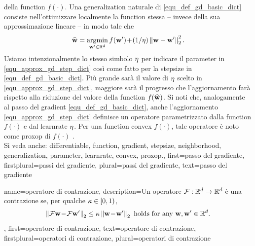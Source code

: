 {{		della \gls{function} $f(\cdot)$. Una \gls{generalization} naturale di \eqref{equ_def_gd_basic_dict} consiste nell’ottimizzare localmente 
		la \gls{function} stessa – invece della sua approssimazione lineare – in modo tale che
		\begin{align} 
		\label{equ_approx_gd_step_dict}
		\widehat{{\bf w}} = \operatorname*{argmin}_{{\bf w}' \in \mathbb{R}^{d}} f({\bf w}')\!+\!(1/\eta)\left\Vert {{\bf w}-{\bf w}'} \right\Vert_{2}^2. 
		\end{align}
		Usiamo intenzionalmente lo stesso simbolo $\eta$ per indicare il \gls{parameter} in \eqref{equ_approx_gd_step_dict} 
		così come fatto per la \gls{stepsize} in \eqref{equ_def_gd_basic_dict}. Più grande sarà il valore di $\eta$ scelto in 
		\eqref{equ_approx_gd_step_dict}, maggiore sarà il progresso che l'aggiornamento farà rispetto alla riduzione del valore della
		\gls{function} $f(\widehat{{\bf w}})$. Si noti che, analogamente al passo del \gls{gradient} \eqref{equ_def_gd_basic_dict}, 
		anche l'aggiornamento \eqref{equ_approx_gd_step_dict} definisce un operatore 
		parametrizzato dalla \gls{function} $f(\cdot)$ e dal \gls{learnrate} $\eta$. Per una \gls{function} \gls{convex}
		$f(\cdot)$, tale operatore è noto come \gls{proxop} di $f(\cdot)$ \cite{ProximalMethods}. 
					\\ 
		Si veda anche: \gls{differentiable}, \gls{function}, \gls{gradient}, \gls{stepsize}, \gls{neighborhood}, 
		\gls{generalization}, \gls{parameter}, \gls{learnrate}, \gls{convex}, \gls{proxop}.},
	first={passo del gradiente},
	firstplural={passi del gradiente},
	plural={passi del gradiente},
	text={passo del gradiente}
}
	
{name={operatore di contrazione},
	description={Un operatore $\mathcal{F}: \mathbb{R}^{d} \rightarrow \mathbb{R}^{d}$
		è una contrazione se, per qualche $\kappa \in [0,1)$,
		\begin{equation} 
			\nonumber
			\left\Vert { \mathcal{F}{\bf w}\!-\!\mathcal{F}{\bf w}'} \right\Vert_{2}  \leq  \kappa	\left\Vert {{\bf w}\!-\!{\bf w}'} \right\Vert_{2} \mbox{ holds for any } {\bf w},{\bf w}' \in \mathbb{R}^{d}.
		\end{equation}
	},
	first={operatore di contrazione},
	text={operatore di contrazione}, 
	firstplural={operatori di contrazione}, 
	plural={operatori di contrazione}
}
	

